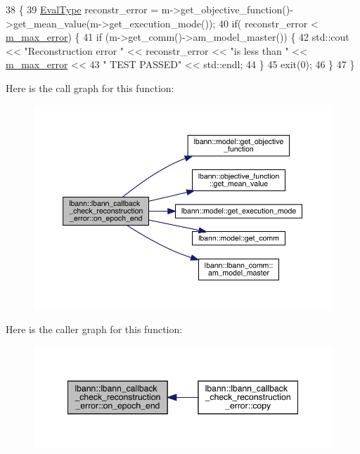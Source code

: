 \begin{DoxyCode}
38                                                                      \{
39   \hyperlink{base_8hpp_a3266f5ac18504bbadea983c109566867}{EvalType} reconstr\_error  = m->get\_objective\_function()->get\_mean\_value(m->get\_execution\_mode());
40   \textcolor{keywordflow}{if}( reconstr\_error < \hyperlink{classlbann_1_1lbann__callback__check__reconstruction__error_a04e779b9e10a909f63f941ea036b3ef4}{m\_max\_error}) \{
41     \textcolor{keywordflow}{if} (m->get\_comm()->am\_model\_master()) \{
42       std::cout << \textcolor{stringliteral}{"Reconstruction error "} << reconstr\_error << \textcolor{stringliteral}{"is less than "} <<  
      \hyperlink{classlbann_1_1lbann__callback__check__reconstruction__error_a04e779b9e10a909f63f941ea036b3ef4}{m\_max\_error} << 
43         \textcolor{stringliteral}{" TEST PASSED"} << std::endl;
44     \}
45      exit(0);
46   \}
47 \}
\end{DoxyCode}
Here is the call graph for this function\+:\nopagebreak
\begin{figure}[H]
\begin{center}
\leavevmode
\includegraphics[width=350pt]{classlbann_1_1lbann__callback__check__reconstruction__error_a8a6a72b8016d3ba3ad11b5e7e2f3f5df_cgraph}
\end{center}
\end{figure}
Here is the caller graph for this function\+:\nopagebreak
\begin{figure}[H]
\begin{center}
\leavevmode
\includegraphics[width=348pt]{classlbann_1_1lbann__callback__check__reconstruction__error_a8a6a72b8016d3ba3ad11b5e7e2f3f5df_icgraph}
\end{center}
\end{figure}
